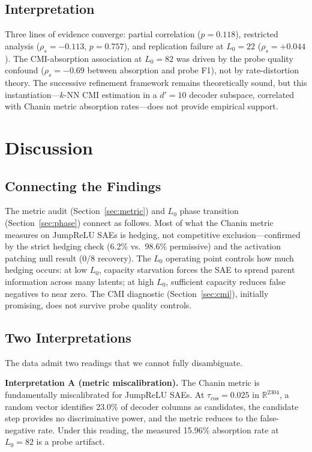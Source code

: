 \documentclass{article}
\begin{document}
\subsection{Interpretation}

Three lines of evidence converge: partial correlation ($p = 0.118$), restricted analysis ($\rho_s = -0.113$, $p = 0.757$), and replication failure at $L_0 = 22$ ($\rho_s = +0.044$). The CMI-absorption association at $L_0 = 82$ was driven by the probe quality confound ($\rho_s = -0.69$ between absorption and probe F1), not by rate-distortion theory. The successive refinement framework remains theoretically sound, but this instantiation---$k$-NN CMI estimation in a $d' = 10$ decoder subspace, correlated with Chanin metric absorption rates---does not provide empirical support.


\section{Discussion}
\label{sec:discussion}

\subsection{Connecting the Findings}

The metric audit (Section~\ref{sec:metric}) and $L_0$ phase transition (Section~\ref{sec:phase}) connect as follows. Most of what the Chanin metric measures on JumpReLU SAEs is hedging, not competitive exclusion---confirmed by the strict hedging check (6.2\% vs.\ 98.6\% permissive) and the activation patching null result (0/8 recovery). The $L_0$ operating point controls how much hedging occurs: at low $L_0$, capacity starvation forces the SAE to spread parent information across many latents; at high $L_0$, sufficient capacity reduces false negatives to near zero. The CMI diagnostic (Section~\ref{sec:cmi}), initially promising, does not survive probe quality controls.

\subsection{Two Interpretations}

The data admit two readings that we cannot fully disambiguate.

\textbf{Interpretation A (metric miscalibration).} The Chanin metric is fundamentally miscalibrated for JumpReLU SAEs. At $\tau_{\cos} = 0.025$ in $\mathbb{R}^{2304}$, a random vector identifies 23.0\% of decoder columns as candidates, the candidate step provides no discriminative power, and the metric reduces to the false-negative rate. Under this reading, the measured 15.96\% absorption rate at $L_0 = 82$ is a probe artifact.
\end{document}
